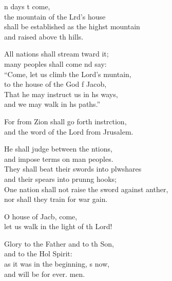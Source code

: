 \settowidth{\versewidth}{One nation shall not raise the sword against another, *}
\begin{psalmverse}%
  \begin{patverse}
n days t come,\Med\\
the mountain of the Lrd’s house\\
shall be established as the highst mountain\Med\\
and raised above th hills.

All nations shall stream tward it;\Med\\
many peoples shall come nd say:\\
“Come, let us climb the Lord’s muntain,\Med\\
to the house of the God f Jacob,\\
That he may instruct us in h\pointup{\i}s ways, \Med\\
and we may walk in h\pointup{\i}s paths.”

For from Zion shall go forth instrction,\Med\\
and the word of the Lord from Jrusalem.

He shall judge between the ntions,\Med\\
and impose terms on man peoples.\\
They shall beat their swords into plwshares\Med\\
and their spears into prun\pointup{\i}ng hooks;\\
One nation shall not raise the sword against anther,\Med\\
nor shall they train for war gain.

O house of Jacb, come,\Med\\
let us walk in the light of th Lord!

Glory to the Father and to th Son,\Med\\
    and to the Hol Spirit:\\
as it was in the beginning, \pointup{\i}s now,\Med\\
    and will be for ever. men.
  \end{patverse}
\end{psalmverse}
